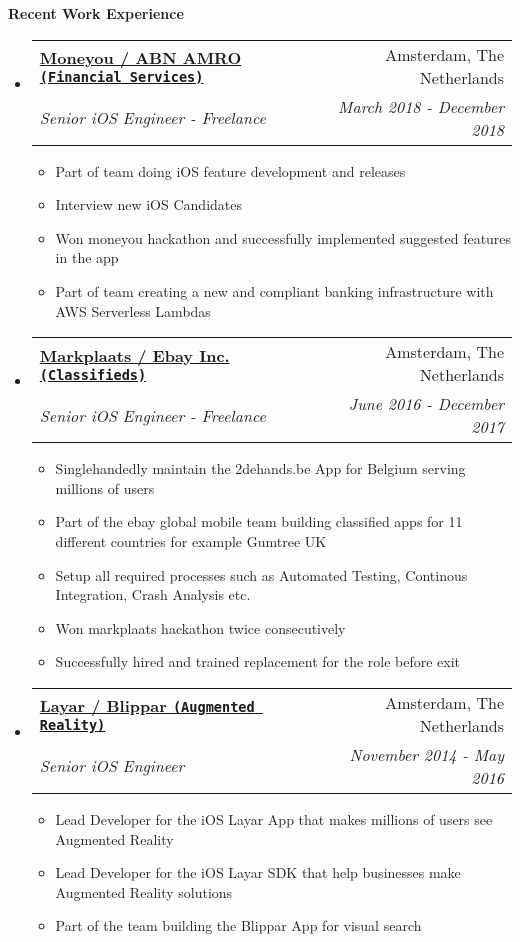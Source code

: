 \documentclass[letterpaper,11pt]{article}
\makeatletter
\newcommand{\resitem}[1]{\item #1 \vspace{-2pt}}
\newcommand{\resheading}[1]{{\large \colorbox{mygrey}{\begin{minipage}{\textwidth}{\textbf{#1 \vphantom{p\^{E}}}}\end{minipage}}}}
\newcommand{\ressubheading}[4]{
\begin{tabular*}{7.0in}{l@{\extracolsep{\fill}}r}
    \textbf{#1} & #2 \\
    \textit{#3} & \textit{#4} \\
\end{tabular*}\vspace{-6pt}}
\makeatother
\begin{document}
\vspace{0.3in}

\resheading{Recent Work Experience}
\begin{itemize}

\item
    \ressubheading{\href{https://www.moneyou.nl/}{Moneyou / ABN AMRO \texttt{(Financial Services)}}}{Amsterdam, The Netherlands}{Senior iOS Engineer - Freelance}{March 2018 - December 2018}
    \begin{itemize}
        \resitem{Part of team doing iOS feature development and releases}
        \resitem{Interview new iOS Candidates}
        \resitem{Won moneyou hackathon and successfully implemented suggested features in the app}
        \resitem{Part of team creating a new and compliant banking infrastructure with AWS Serverless Lambdas}
    \end{itemize}

\item
    \ressubheading{\href{https://www.ebay.com/}{Markplaats / Ebay Inc. \texttt{(Classifieds)}}}{Amsterdam, The Netherlands}{Senior iOS Engineer - Freelance}{June 2016 - December 2017}
    \begin{itemize}
        \resitem{Singlehandedly maintain the 2dehands.be App for Belgium serving millions of users}
        \resitem{Part of the ebay global mobile team building classified apps for 11 different countries for example Gumtree UK}
        \resitem{Setup all required processes such as Automated Testing, Continous Integration, Crash Analysis etc.}
        \resitem {Won markplaats hackathon twice consecutively}
        \resitem{Successfully hired and trained replacement for the role before exit}
    \end{itemize}
    
\item
    \ressubheading{\href{https://www.layar.com/}{Layar / Blippar \texttt{(Augmented Reality)}}}{Amsterdam, The Netherlands}{Senior iOS Engineer}{November 2014 - May 2016}
    \begin{itemize}
        \resitem{Lead Developer for the iOS Layar App that makes millions of users see Augmented Reality}
        \resitem{Lead Developer for the iOS Layar SDK that help businesses make Augmented Reality solutions}
        \resitem{Part of the team building the Blippar App for visual search}
    \end{itemize}

\end{itemize}
\end{document}
